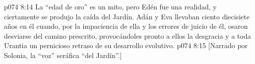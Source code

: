 \vs p074 8:14 \pc La “edad de oro” es un mito, pero Edén fue una realidad, y ciertamente se produjo la caída del Jardín. Adán y Eva llevaban ciento diecisiete años en él cuando, por la impaciencia de ella y los errores de juicio de él, osaron desviarse del camino prescrito, provocándoles pronto a ellos la desgracia y a toda Urantia un pernicioso retraso de su desarrollo evolutivo.
\vsetoff
\vs p074 8:15 [Narrado por Solonia, la “voz” seráfica “del Jardín”.]
